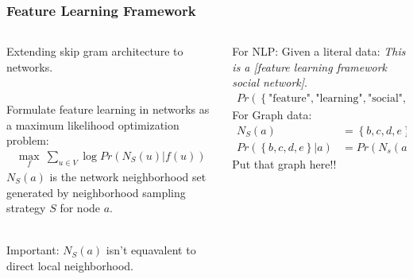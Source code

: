 \documentclass[notes, 10pt, aspectratio=169]{beamer}
\begin{document}
\begin{frame}
    \frametitle{Feature Learning Framework}
    \begin{columns}
        \begin{column}{0.5\textwidth}
            Extending skip gram architecture to networks.\par ~\\
            Formulate feature learning in networks as a maximum likelihood optimization problem:
            \begin{align*}
                \max_{f}\ \sum_{u\in V}\log Pr\left( N_S\left( u \right)| f(u)  \right) 
            \end{align*}
            $N_S\left( a \right)$ is the network neighborhood set generated by neighborhood sampling strategy $S$ for node $a$.\par ~\\
            Important: $N_S\left( a \right)$ isn’t equavalent to direct local neighborhood.
        \end{column}
        \begin{column}{0.5\textwidth}
            For NLP: Given a literal data: \textit{This is a [feature learning \alert{framework} social network]}.
            \begin{align*}
                \scriptstyle
                Pr \left( \left\{ \text{"feature"}, \text{"learning"}, \text{"social"}, \text{"network"} \right\} | \text{"framework"} \right) 
            \end{align*}
            For Graph data: 
            \begin{align*}
                N_S\left( a \right) &= \left\{ b, c, d, e \right\} \\
            Pr\left( \left\{ b, c, d, e \right\}| a \right) &= Pr\left( N_s\left( a \right) | a \right) 
            \end{align*}
            Put that graph here!! 

\end{column}
\end{columns}
\end{frame}
\end{document}
